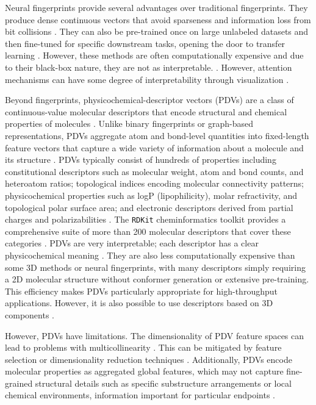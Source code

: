 Neural fingerprints provide several advantages over traditional fingerprints. They produce dense continuous vectors that avoid sparseness and information loss from bit collisions \citep{Jaeger2018}. They can also be pre-trained once on large unlabeled datasets and then fine-tuned for specific downstream tasks, opening the door to transfer learning \citep{Chithrananda2020, Fabian2020}. However, these methods are often computationally expensive \citep{Jaeger2018} and due to their black-box nature, they are not as interpretable.  \citep{Chithrananda2020}. However, attention mechanisms can have some degree of interpretability through visualization \citep{Chithrananda2020}.

Beyond fingerprints, physicochemical-descriptor vectors (PDVs) are a class of continuous-value molecular descriptors that encode structural and chemical properties of molecules \citep{Todeschini2009}. Unlike binary fingerprints or graph-based representations, PDVs aggregate atom and bond-level quantities into fixed-length feature vectors that capture a wide variety of information about a molecule and its structure \citep{Mauri2006}. PDVs typically consist of hundreds of properties including constitutional descriptors such as molecular weight, atom and bond counts, and heteroatom ratios; topological indices encoding molecular connectivity patterns; physicochemical properties such as logP (lipophilicity), molar refractivity, and topological polar surface area; and electronic descriptors derived from partial charges and polarizabilities \citep{Todeschini2009, Cherkasov2014}. The \texttt{RDKit} cheminformatics toolkit provides a comprehensive suite of more than 200 molecular descriptors that cover these categories \citep{rdkit}. PDVs are very interpretable; each descriptor has a clear physicochemical meaning \citep{Cherkasov2014}. They are also less computationally expensive than some 3D methods or neural fingerprints, with many descriptors simply requiring a 2D molecular structure without conformer generation or extensive pre-training. This efficiency makes PDVs particularly appropriate for high-throughput applications. However, it is also possible to use descriptors based on 3D components \citep{Mauri2006}.

However, PDVs have limitations. The dimensionality of PDV feature spaces can lead to problems with multicollinearity \citep{Todeschini2009}. This can be mitigated by feature selection or dimensionality reduction techniques \citep{Cherkasov2014}. Additionally, PDVs encode molecular properties as aggregated global features, which may not capture fine-grained structural details such as specific substructure arrangements or local chemical environments, information important for particular endpoints \citep{Mauri2006}.

